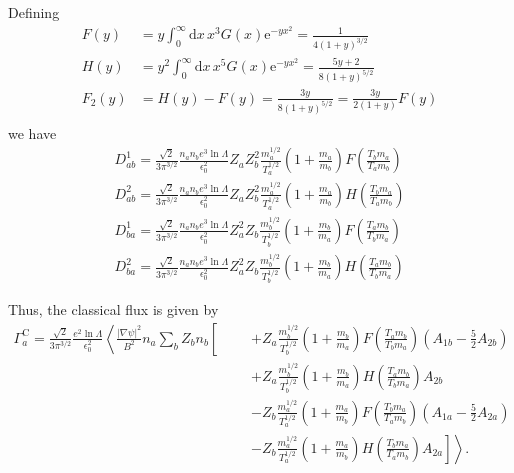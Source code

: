 \documentclass[12pt, a4paper]{article}
\newcommand{\e}{\ensuremath{\mathrm{e}}}
\renewcommand{\d}{\ensuremath{\mathrm{d}}}
\newcommand{\lang}{\left\langle}
\newcommand{\rang}{\right\rangle}
\begin{document}
Defining
\begin{align}
  F(y) &= y\int_0^{\infty} \d x\, x^3 G(x) \e^{-yx^2}  = \frac{1}{4(1+y)^{3/2}} \\
  H(y) &= y^2\int_0^{\infty} \d x\, x^5 G(x) \e^{-yx^2} =  \frac{5y + 2}{8(1+y)^{5/2}}\\
  F_2(y) &= H(y)-F(y) =  \frac{3y}{8(1+y)^{5/2}} = \frac{3y}{2(1+y)} F(y)\\
\end{align}
we have
\begin{align}
  D^1_{ab} = \frac{\sqrt{2}}{3\pi^{3/2}} \frac{n_a n_b  e^3 \ln \Lambda}{\epsilon_0^2 }  Z_a Z_b^2\frac{m_a^{1/2}}{T_a^{1/2}}\left(1 + \frac{m_a}{m_b} \right) F\left(\frac{T_b m_a}{T_a m_b}\right) \\
  D^2_{ab} = \frac{\sqrt{2}}{3\pi^{3/2}} \frac{n_a n_b e^3 \ln \Lambda}{\epsilon_0^2 }  Z_a Z_b^2 \frac{m_a^{1/2}}{T_a^{1/2}} \left(1 + \frac{m_a}{m_b}\right) H\left(\frac{T_b m_a}{T_a m_b}\right) \\
  D^1_{ba} = \frac{\sqrt{2}}{3\pi^{3/2}} \frac{n_a n_b  e^3 \ln \Lambda}{\epsilon_0^2 } Z_a^2 Z_b \frac{m_b^{1/2}}{T_b^{1/2}} \left(1 + \frac{m_b}{m_a} \right)  F\left(\frac{T_a m_b}{T_b m_a}\right) \\
D^2_{ba} = \frac{\sqrt{2}}{3\pi^{3/2}} \frac{n_a n_b e^3 \ln \Lambda}{\epsilon_0^2 }  Z_a^2 Z_b \frac{m_b^{1/2}}{T_b^{1/2}}  \left(1 + \frac{m_b}{m_a}\right) H\left(\frac{T_a m_b}{T_b m_a}\right)
\end{align}

Thus, the classical flux is given by
\begin{equation}
  \begin{aligned}
   \Gamma_a^{\text{C}} = \frac{\sqrt{2}}{3\pi^{3/2}} \frac{ e^2 \ln \Lambda}{\epsilon_0^2 } 
    \lang \frac{|\nabla \psi|^2}{B^2} n_a \sum_b Z_b n_b \right.\left[\phantom{\frac{m_b^{3/2}}{m_a}} \right.
      &+ Z_a  \frac{m_b^{1/2}}{T_b^{1/2}} \left(1 + \frac{m_b}{m_a} \right)  F\left(\frac{T_a m_b}{T_b m_a}\right) \left(A_{1b} - \frac{5}{2} A_{2b}\right) \\
      &+ Z_a  \frac{m_b^{1/2}}{T_b^{1/2}} \left(1 + \frac{m_b}{m_a}\right) H\left(\frac{T_a m_b}{T_b m_a}\right) A_{2b} \\
      &-Z_b\frac{m_a^{1/2}}{T_a^{1/2}}\left(1 + \frac{m_a}{m_b} \right) F\left(\frac{T_b m_a}{T_a m_b}\right) \left(A_{1a} - \frac{5}{2} A_{2a}\right) \\ &\left.\left.
      - Z_b \frac{m_a^{1/2}}{T_a^{1/2}}  \left(1 + \frac{m_a}{m_b}\right) H\left(\frac{T_b m_a}{T_a m_b}\right)A_{2a} \right] \rang.
\end{aligned}
\end{equation}
\end{document}
